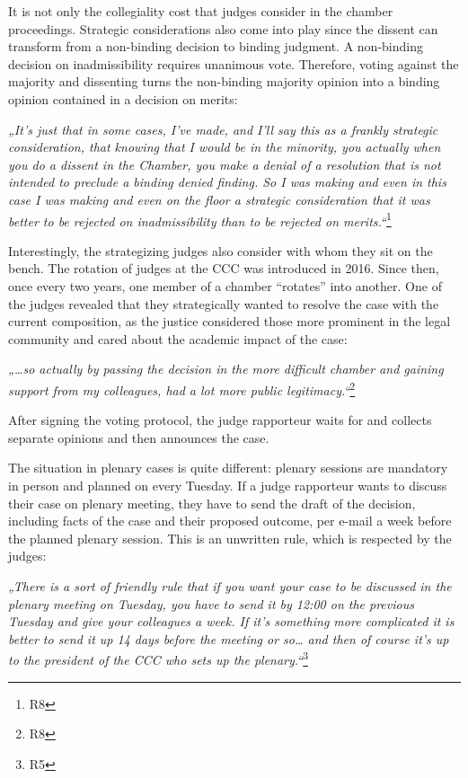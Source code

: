 \documentclass[
  11pt,
]{article}
\begin{document}
It is not only the collegiality cost that judges consider in the chamber proceedings. Strategic considerations also come into play since the dissent can transform from a non-binding decision to binding judgment. A non-binding decision on inadmissibility requires unanimous vote. Therefore, voting against the majority and dissenting turns the non-binding majority opinion into a binding opinion contained in a decision on merits:

\emph{„It's just that in some cases, I've made, and I'll say this as a frankly strategic consideration, that knowing that I would be in the minority, you actually when you do a dissent in the Chamber, you make a denial of a resolution that is not intended to preclude a binding denied finding. So I was making and even in this case I was making and even on the floor a strategic consideration that it was better to be rejected on inadmissibility than to be rejected on merits.``}\footnote{R8}

Interestingly, the strategizing judges also consider with whom they sit on the bench. The rotation of judges at the CCC was introduced in 2016. Since then, once every two years, one member of a chamber ``rotates'' into another. One of the judges revealed that they strategically wanted to resolve the case with the current composition, as the justice considered those more prominent in the legal community and cared about the academic impact of the case:

\emph{„\ldots so actually by passing the decision in the more difficult chamber and gaining support from my colleagues, had a lot more public legitimacy.``}\footnote{R8}

After signing the voting protocol, the judge rapporteur waits for and collects separate opinions and then announces the case.

The situation in plenary cases is quite different: plenary sessions are mandatory in person and planned on every Tuesday. If a judge rapporteur wants to discuss their case on plenary meeting, they have to send the draft of the decision, including facts of the case and their proposed outcome, per e-mail a week before the planned plenary session. This is an unwritten rule, which is respected by the judges:

\emph{„There is a sort of friendly rule that if you want your case to be discussed in the plenary meeting on Tuesday, you have to send it by 12:00 on the previous Tuesday and give your colleagues a week. If it's something more complicated it is better to send it up 14 days before the meeting or so\ldots{} and then of course it's up to the president of the CCC who sets up the plenary.``}\footnote{R5}
\end{document}
